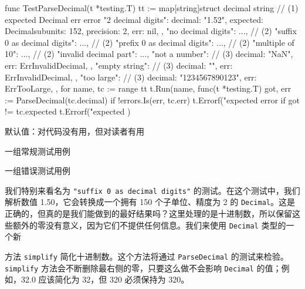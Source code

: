 \begin{gocode}[title={代码清单 6.10 \texttt{decimal\_internal\_test.go}：测试 \texttt{ParseDecimal}}]
func TestParseDecimal(t *testing.T) {
    tt := map[string]struct {
        decimal string // (1)
        expected Decimal
        err      error
    }{
        "2 decimal digits": {
            decimal: "1.52",
            expected: Decimal{subunits: 152, precision: 2},
            err:       nil,
        },
        "no decimal digits": {...}, // (2)
        "suffix 0 as decimal digits": {...}, // (2)
        "prefix 0 as decimal digits": {...}, // (2)
        "multiple of 10": {...}, // (2)
        "invalid decimal part": {...},
        "not a number": { // (3)
            decimal: "NaN",
            err:    ErrInvalidDecimal,
        },
        "empty string": { // (3)
            decimal: "",
            err:    ErrInvalidDecimal,
        },
        "too large": {     // (3)
            decimal: "1234567890123",
            err:    ErrTooLarge,
        },
    }
    for name, tc := range tt {
        t.Run(name, func(t *testing.T) {
            got, err := ParseDecimal(tc.decimal)
            if !errors.Is(err, tc.err) {
                t.Errorf("expected error %
            }
            if got != tc.expected {
                t.Errorf("expected %
            }
        })
    }
}
\end{gocode}

\begin{codeannotations}
\item 默认值：对代码没有用，但对读者有用
\item 一组常规测试用例
\item 一组错误测试用例
\end{codeannotations}

我们特别来看名为 \texttt{"suffix 0 as decimal digits"} 的测试。在这个测试中，我们解析数值 1.50，它会转换成一个拥有 150 个子单位、精度为 2 的 \texttt{Decimal}。这是正确的，但真的是我们能做到的最好结果吗？这里处理的是十进制数，所以保留这些额外的零没有意义，因为它们不提供任何信息。我们来使用 \texttt{Decimal} 类型的一个新

方法 \texttt{simplify} 简化十进制数。这个方法将通过 \texttt{ParseDecimal} 的测试来检验。\texttt{simplify} 方法会不断删除最右侧的零，只要这么做不会影响 \texttt{Decimal} 的值；例如，32.0 应该简化为 32，但 320 必须保持为 320。


